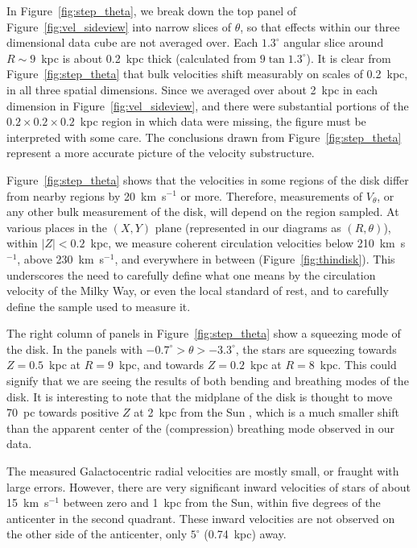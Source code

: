\documentclass[11pt,preprint]{aastex6}
\begin{document}
 In Figure~\ref{fig:step_theta}, we break down the top panel of Figure~\ref{fig:vel_sideview} into narrow slices of $\theta$, so that effects within our three dimensional data cube are not averaged over.  Each $1.3^\circ$ angular slice around $R\sim9$~kpc is about  0.2~kpc thick (calculated from $9 \tan{1.3^\circ}$).  It is clear from Figure~\ref{fig:step_theta} that bulk velocities shift measurably on scales of 0.2~kpc, in all three spatial dimensions.  Since we averaged over about 2~kpc in each dimension in Figure~\ref{fig:vel_sideview}, and there were substantial portions of the $0.2 \times 0.2 \times 0.2$~kpc region in which data were missing, the figure must be interpreted with some care.  The conclusions drawn from Figure~\ref{fig:step_theta} represent a more accurate picture of the velocity substructure.
 
Figure~\ref{fig:step_theta} shows that the velocities in some regions of the disk differ from nearby regions by 20~km~s$^{-1}$ or more.  Therefore, measurements of $V_\theta$, or any other bulk measurement of the disk, will depend on the region sampled.  At various places in the $(X,Y)$ plane (represented in our diagrams as $(R, \theta)$), within $|Z|<0.2$~kpc, we measure coherent circulation velocities below 210~km~s$^{-1}$, above 230~km~s$^{-1}$, and everywhere in between (Figure~\ref{fig:thindisk}).  This underscores the need to carefully define what one means by the circulation velocity of the Milky Way, or even the local standard of rest, and to carefully define the sample used to measure it. 

 
The right column of panels in Figure~\ref{fig:step_theta} show a squeezing mode of the disk.  In the panels with $-0.7^\circ>\theta>-3.3^\circ$, the stars are squeezing towards $Z=0.5$~kpc at $R=9$~kpc, and towards $Z=0.2$~kpc at $R=8$~kpc.  This could signify that we are seeing the results of both bending and breathing modes of the disk.  It is interesting to note that the midplane of the disk is thought to move 70~pc towards positive $Z$ at 2~kpc from the Sun \citep[corresponding to our $R=10$~kpc;][]{Xu2015}, which is a much smaller shift than the apparent center of the (compression) breathing mode observed in our data.
 
The measured Galactocentric radial velocities are mostly small, or fraught with large errors.  However, there are very significant inward velocities of stars of about 15~km~s$^{-1}$ between zero and 1~kpc from the Sun, within five degrees of the anticenter in the second quadrant.  These inward velocities are not observed on the other side of the anticenter, only $5^\circ$ (0.74~kpc) away.
\end{document}
